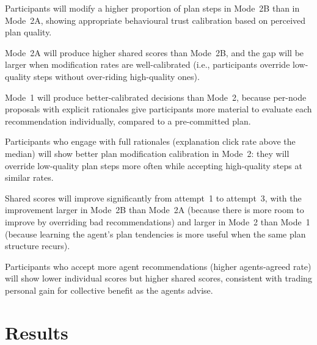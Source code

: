 \documentclass[11pt]{article}
\theoremstyle{definition}
\begin{document}
\begin{description}[leftmargin=2em, itemsep=3pt]
  \item[H1 \textit{(Quality detection)}]
    Participants will modify a higher proportion of plan steps in Mode~2B than in
    Mode~2A, showing appropriate behavioural trust calibration based on perceived plan
    quality.

  \item[H2 \textit{(Score gap)}]
    Mode~2A will produce higher shared scores than Mode~2B, and the gap will be larger
    when modification rates are well-calibrated (i.e., participants override low-quality
    steps without over-riding high-quality ones).

  \item[H3 \textit{(Transparency benefit)}]
    Mode~1 will produce better-calibrated decisions than Mode~2, because per-node
    proposals with explicit rationales give participants more material to evaluate each
    recommendation individually, compared to a pre-committed plan.

  \item[H4 \textit{(Explanation engagement and calibration)}]
    Participants who engage with full rationales (explanation click rate above the
    median) will show better plan modification calibration in Mode~2: they will override
    low-quality plan steps more often while accepting high-quality steps at similar rates.

  \item[H5 \textit{(Learning across attempts)}]
    Shared scores will improve significantly from attempt~1 to attempt~3, with the
    improvement larger in Mode~2B than Mode~2A (because there is more room to improve by
    overriding bad recommendations) and larger in Mode~2 than Mode~1 (because learning
    the agent's plan tendencies is more useful when the same plan structure recurs).

  \item[H6 \textit{(Individual vs.\ shared sacrifice)}]
    Participants who accept more agent recommendations (higher agents-agreed rate) will
    show lower individual scores but higher shared scores, consistent with trading
    personal gain for collective benefit as the agents advise.
\end{description}

\section{Results}
\label{sec:results}
\end{document}

